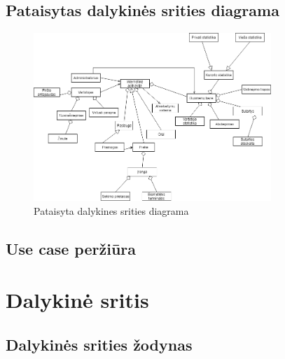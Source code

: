 \documentclass[oneside]{VUMIFPSkursinis}
\begin{document}
\begin{enumerate}
\end{enumerate}


\pagebreak

\subsection{Pataisytas dalykinės srities diagrama}
\begin{figure}[h]
    \centering
    \includegraphics[width=0.80\textwidth]{DomainModelFixed.png}
    \caption{Pataisyta dalykines srities diagrama}
    \label{fig:Pataisyta dalykinės srities diagrama}
\end{figure}
\subsection{Use case peržiūra}

\section{Dalykinė sritis}
\subsection{Dalykinės srities žodynas}
\end{document}
